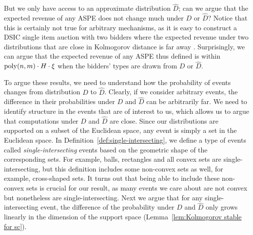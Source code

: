 { But we only have access to an approximate distribution $\hat{D}$; can we argue that the expected revenue of any ASPE does not change much under $D$ or $\hat{D}$? Notice that this is certainly not true for arbitrary mechanisms, as it is easy to construct a DSIC single item auction with two bidders where the expected revenue under two distributions that are close in Kolmogorov distance is far away%
 . Surprisingly, we can argue that the expected revenue of any ASPE thus defined is within ${\rm poly}(n,m)\cdot H\cdot \xi$ when the bidders' types are drawn from $D$ or $\hat{D}$.

 To argue these results, we need to understand how the probability of events changes from distribution $D$ to $\hat{D}$. Clearly, if we consider arbitrary events, the difference in their probabilities under $D$ and $\hat{D}$ can be arbitrarily far. We need to identify structure in the events that are of interest to us, which allows us to argue that computations under $D$ and $\hat{D}$ are close. Since our distributions are supported on a subset of the Euclidean space, any event is simply a set in the Euclidean space. In Definition~\ref{def:single-intersecting}, we define a type of events called \emph{single-intersecting} events based on the geometric shape of the corresponding sets. For example, balls, rectangles and all convex sets are single-intersecting, but this definition includes some non-convex sets as well, for example, cross-shaped sets. It turns out that being able to include these non-convex sets is crucial for our result, as many events we care about are not convex but nonetheless are single-intersecting. Next we argue that for any single-intersecting event, the difference of the probability under $D$ and $\hat{D}$ only grows linearly in the dimension of the support space (Lemma~\ref{lem:Kolmogorov stable for sc}).
}
